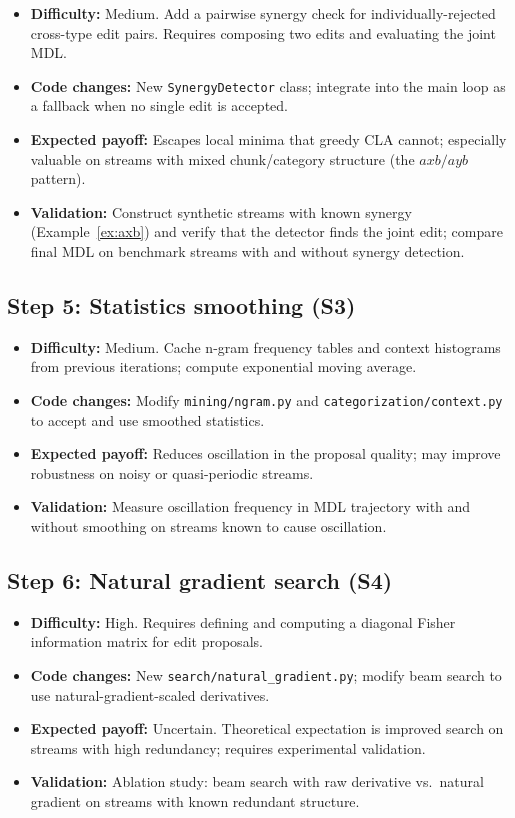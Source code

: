 \documentclass[11pt]{article}
\begin{document}
\begin{itemize}
  \item \textbf{Difficulty:} Medium.  Add a pairwise synergy check for individually-rejected cross-type edit pairs.  Requires composing two edits and evaluating the joint MDL.
  \item \textbf{Code changes:} New \texttt{SynergyDetector} class; integrate into the main loop as a fallback when no single edit is accepted.
  \item \textbf{Expected payoff:} Escapes local minima that greedy CLA cannot; especially valuable on streams with mixed chunk/category structure (the $axb/ayb$ pattern).
  \item \textbf{Validation:} Construct synthetic streams with known synergy (Example~\ref{ex:axb}) and verify that the detector finds the joint edit; compare final MDL on benchmark streams with and without synergy detection.
\end{itemize}

\subsection{Step 5: Statistics smoothing (S3)}

\begin{itemize}
  \item \textbf{Difficulty:} Medium.  Cache n-gram frequency tables and context histograms from previous iterations; compute exponential moving average.
  \item \textbf{Code changes:} Modify \texttt{mining/ngram.py} and \texttt{categorization/context.py} to accept and use smoothed statistics.
  \item \textbf{Expected payoff:} Reduces oscillation in the proposal quality; may improve robustness on noisy or quasi-periodic streams.
  \item \textbf{Validation:} Measure oscillation frequency in MDL trajectory with and without smoothing on streams known to cause oscillation.
\end{itemize}

\subsection{Step 6: Natural gradient search (S4)}

\begin{itemize}
  \item \textbf{Difficulty:} High.  Requires defining and computing a diagonal Fisher information matrix for edit proposals.
  \item \textbf{Code changes:} New \texttt{search/natural\_gradient.py}; modify beam search to use natural-gradient-scaled derivatives.
  \item \textbf{Expected payoff:} Uncertain.  Theoretical expectation is improved search on streams with high redundancy; requires experimental validation.
  \item \textbf{Validation:} Ablation study: beam search with raw derivative vs.\ natural gradient on streams with known redundant structure.
\end{itemize}
\end{document}
